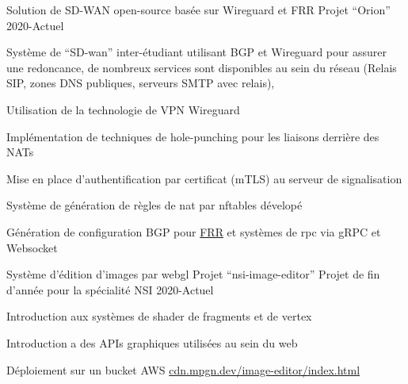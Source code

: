 
\begin{cventries}
  \cventry
    {Solution de SD-WAN open-source basée sur Wireguard et FRR}
    {Projet ``Orion'' \href{https://github.com/Orion-network-dev}{\faGithubSquare}}
    {}
    {2020-Actuel}
    {
      \begin{cvitems}
        \item {Système de ``SD-wan'' inter-étudiant utilisant BGP et Wireguard pour assurer une redoncance,
        de nombreux services sont disponibles au sein du réseau (Relais SIP, zones DNS publiques, serveurs SMTP avec relais), 
        }
        \item {Utilisation de la technologie de VPN Wireguard}
        \item {Implémentation de techniques de hole-punching pour les liaisons derrière des NATs}
        \item {Mise en place d'authentification par certificat (mTLS) au serveur de signalisation}
        \item {Système de génération de règles de nat par nftables dévelopé}
        \item {Génération de configuration BGP pour \href{https://github.com/FRRouting/frr.git}{FRR} et systèmes de rpc via gRPC et Websocket}
      \end{cvitems}
    }

  \cventry
    {Système d'édition d'images par webgl}
    {Projet ``nsi-image-editor'' \href{https://github.com/MatthieuCoder/nsi-image-editor}{\faGithubSquare}}
    {Projet de fin d'année pour la spécialité NSI}
    {2020-Actuel}
    {
      \begin{cvitems}
        \item {Introduction aux systèmes de shader de fragments et de vertex} 
        \item {Introduction a des APIs graphiques utilisées au sein du web}
        \item {Déploiement sur un bucket AWS \href{https://cdn.mpgn.dev/image-editor/index.html}{cdn.mpgn.dev/image-editor/index.html}}
      \end{cvitems}
    }


\end{cventries}
